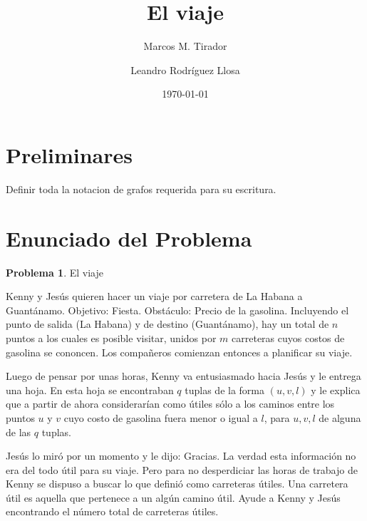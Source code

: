 \documentclass[10pt]{amsart}
\theoremstyle{definition}
\newtheorem{prob}[theorem]{Problema}
\numberwithin{equation}{section}
\begin{document}
	
	\mbox{}
	\title{El viaje}
	
	\author{Marcos M. Tirador}
	\address{Facultad de Matem\'atica y Computaci\'on \\ Universidad de La Habana \\ Ciudad de La Habana \\ Cuba}
	
	
	\author{Leandro Rodr\'iguez Llosa}
	\address{Facultad de Matem\'atica y Computaci\'on \\ Universidad de La Habana \\ Ciudad de La Habana \\ Cuba}
		

\date{\today}


\bigskip
\maketitle


\bigskip

\section{Preliminares}
	Definir toda la notacion de grafos requerida para su escritura.
\section{Enunciado del Problema}
	\begin{prob}
		El viaje
	
		Kenny y Jesús quieren hacer un viaje por carretera de La Habana a Guantánamo. Objetivo: Fiesta. Obstáculo: Precio de la gasolina. Incluyendo el punto de salida (La Habana) y de destino (Guantánamo), hay un total de $n$ puntos a los cuales es posible visitar, unidos por $m$ carreteras cuyos costos de gasolina se cononcen. Los compañeros comienzan entonces a planificar su viaje.
		
		Luego de pensar por unas horas, Kenny va entusiasmado hacia Jesús y le entrega una hoja. En esta hoja se encontraban $q$ tuplas de la forma $(u, v, l)$ y le explica que a partir de ahora considerarían como útiles sólo a los caminos entre los puntos $u$ y $v$ cuyo costo de gasolina fuera menor o igual a $l$, para $u, v, l$ de alguna de las $q$ tuplas.
		
		Jesús lo miró por un momento y le dijo: Gracias. La verdad esta información no era del todo útil para su viaje. Pero para no desperdiciar las horas de trabajo de Kenny se dispuso a buscar lo que definió como carreteras útiles. Una carretera útil es aquella que pertenece a un algún camino útil. Ayude a Kenny y Jesús encontrando el número total de carreteras útiles.
	\end{prob}	
\end{document}
